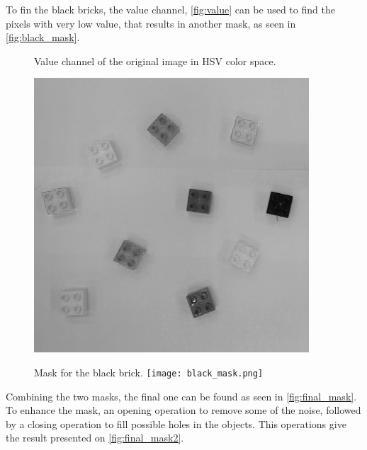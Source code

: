 To fin the black bricks, the value channel, \autoref{fig:value} can be used to find the pixels with very low value, that results in another mask, as seen in \autoref{fig:black_mask}.

\begin{figure}[H]
    \captionbox  %
    {
        Value channel of the original image in HSV color space.                
        \label{fig:value}                                  
    }                                                                 
    {       
        
        \includegraphics[width=.25\textwidth]{figures/value.png}         
    }                                                                    
    \hspace{5pt}                                                          
    \captionbox
    {  
        Mask for the black brick.
        \label{fig:black_mask}                                     
    }
    {
        \texttt{[image: black\_mask.png]}            
    }                                                                             
\end{figure}

Combining the two masks, the final one can be found as seen in \autoref{fig:final_mask}. To enhance the mask, an opening operation to remove some of the noise, followed by a closing operation to fill possible holes in the objects. This operations give the result presented on \autoref{fig:final_mask2}.

